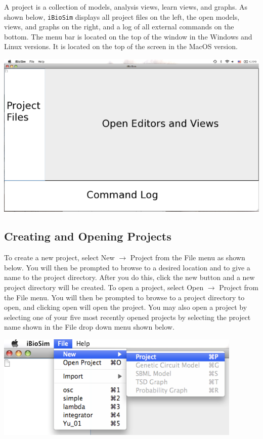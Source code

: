 \documentclass[titlepage,11pt]{article}
\begin{document}
\noindent
A project is a collection of models, analysis views, learn
views, and graphs.  As shown below, {\tt iBioSim} displays all project
files on the left, the open models, views, and graphs on the
right, and a log of all external commands on the bottom.
The menu bar is located on the top of the window in the Windows and
Linux versions.  It is located on the top of the screen in the MacOS version.
\begin{center}
\includegraphics[height=80mm]{screenshots/iBioSim}
\end{center}

\subsection{Creating and Opening Projects}

\noindent
To create a new project, select New $\rightarrow$ Project from the File
menu as shown below. You will then be prompted to browse to a desired location
and to give a name to the project directory. After you do this,
click the new button and a new project directory will be created.
To open a project, select Open $\rightarrow$ Project from the File menu.
You will then be prompted to browse to a project directory to
open, and clicking open will open the project. You may also open
a project by selecting one of your five most recently opened
projects by selecting the project name shown in the File drop
down menu shown below. 
\begin{center}
\includegraphics[height=50mm]{screenshots/project}
\end{center}
\end{document}
